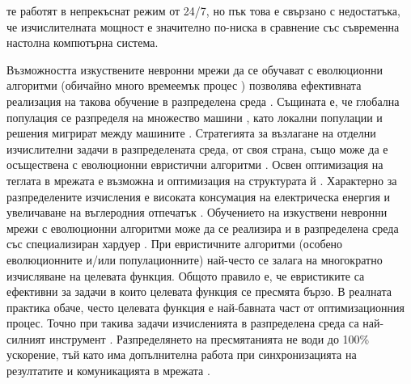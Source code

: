 те работят в непрекъснат режим от 24/7, но пък това е свързано с недостатъка, че изчислителната мощност е значително по-ниска в сравнение със съвременна настолна компютърна система. 

Възможността изкуствените невронни мрежи да се обучават с еволюционни алгоритми (обичайно много времеемък процес \cite{Guo-01}) позволява ефективната реализация на такова обучение в разпределена среда \cite{Pandey-01}. Същината е, че глобална популация се разпределя на множество машини \cite{Plagianakos-01}, като локални популации и решения мигрират между машините \cite{Tan-01}. Стратегията за възлагане на отделни изчислителни задачи в разпределената среда, от своя страна, също може да е осъществена с еволюционни евристични алгоритми \cite{Sharma-01}. Освен оптимизация на теглата в мрежата е възможна и оптимизация на структурата й \cite{Desell-01}. Характерно за разпределените изчисления е високата консумация на електрическа енергия \cite{Foo-01} и увеличаване на въглеродния отпечатък \cite{Kumar-01}. Обучението на изкуствени невронни мрежи с еволюционни алгоритми може да се реализира и в разпределена среда със специализиран хардуер \cite{Epitropakis-01}. При евристичните алгоритми (особено еволюционните и/или популационните) най-често се залага на многократно изчисляване на целевата функция. Общото правило е, че евристиките са ефективни за задачи в които целевата функция се пресмята бързо. В реалната практика обаче, често целевата функция е най-бавната част от оптимизационния процес. Точно при такива задачи изчисленията в разпределена среда са най-силният инструмент \cite{Liu-01}. Разпределянето на пресмятанията не води до 100\% ускорение, тъй като има допълнителна работа при синхронизацията на резултатите и комуникацията в мрежата \cite{Gong-01}.

